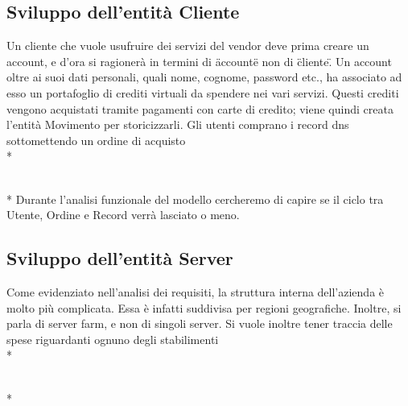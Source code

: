 \documentclass[11pt,a4paper] {article}
\begin{document}
\newpage
\subsection{Sviluppo dell'entit\`a Cliente}
Un cliente che vuole usufruire dei servizi del vendor deve prima creare un account, e d'ora si ragioner\`a in termini di \"account\" e non di \"cliente\".
Un account oltre ai suoi dati personali, quali nome, cognome, password etc., ha associato ad esso un portafoglio di crediti virtuali da spendere nei vari servizi. Questi crediti vengono acquistati tramite pagamenti con carte di credito; viene quindi creata l'entità Movimento per storicizzarli.
Gli utenti comprano i record dns sottomettendo un ordine di acquisto
\\*
\begin{figure}[!h]
\centering
{}
\end{figure}
\\*
Durante l'analisi funzionale del modello cercheremo di capire se il ciclo tra Utente, Ordine e Record verrà lasciato o meno.

\newpage
\subsection{Sviluppo dell'entit\`a Server}
Come evidenziato nell'analisi dei requisiti, la struttura interna dell'azienda è molto più complicata. Essa è infatti suddivisa per regioni geografiche. Inoltre, si parla di server farm, e non di singoli server. 
\newline
Si vuole inoltre tener traccia delle spese riguardanti ognuno degli stabilimenti
\\*
\begin{figure}[!h]
\centering
{}
\end{figure}
\\*
\end{document}
